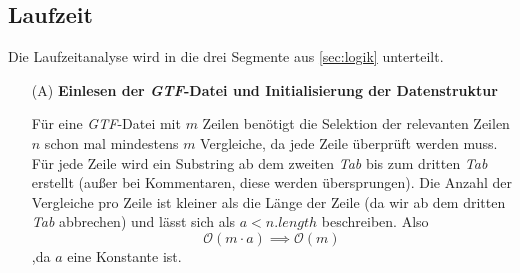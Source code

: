 \documentclass[12pt]{article}
\begin{document}
\subsection{Laufzeit}
Die Laufzeitanalyse wird in die drei Segmente aus \ref{sec:logik} unterteilt.
\begin{enumerate}
	\item[(A)] \textbf{Einlesen der \textit{GTF}-Datei und Initialisierung der Datenstruktur}

		Für eine \textit{GTF}-Datei mit $m$ Zeilen benötigt die Selektion der relevanten Zeilen $n$
		schon mal mindestens $m$ Vergleiche, da jede Zeile überprüft werden muss.
		Für jede Zeile wird ein Substring ab dem zweiten \textit{Tab} bis zum dritten \textit{Tab} erstellt (au\ss er bei Kommentaren, diese werden übersprungen).
		Die Anzahl der Vergleiche pro Zeile ist kleiner als die Länge der Zeile (da wir ab dem dritten \textit{Tab} abbrechen) und lässt
		sich als $a < n.length$ beschreiben. Also
		\begin{equation}
			\mathcal{O}(m \cdot a) \implies \mathcal{O}(m)
		\end{equation}
		,da $a$ eine Konstante ist.


\end{enumerate}
\end{document}
